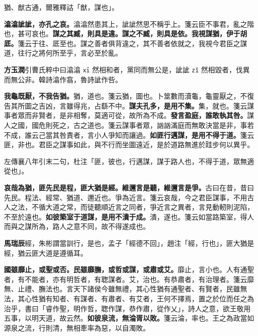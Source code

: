 \begin{quoting}猶、猷古通，爾雅釋詁「猷，謀也」。\end{quoting}

\textbf{潝潝訿訿，亦孔之哀。}{\footnotesize 潝潝然患其上，訿訿然思不稱乎上。箋云臣不事君，亂之階也，甚可哀也。}\textbf{謀之其臧，則具是違。謀之不臧，則具是依。我視謀猶，伊于胡厎。}{\footnotesize 箋云于往、厎至也。謀之善者俱背違之，其不善者依就之，我視今君臣之謀道，往行之將何所至乎，言必至於亂。}

\begin{quoting}\textbf{方玉潤}引曹氏粹中曰潝潝 \texttt{xī} 然相和者，黨同而無公是，訿訿 \texttt{zǐ} 然相毀者，伐異而無公非。韓詩潝作翕，魯詩訿作呰。\end{quoting}

\textbf{我龜既厭，不我告猶。}{\footnotesize 猶，道也。箋云猶，圖也。卜筮數而瀆龜，龜靈厭之，不復告其所圖之吉凶，言雖得兆，占繇不中。}\textbf{謀夫孔多，是用不集。}{\footnotesize 集，就也。箋云謀事者眾而非賢者，是非相奪，莫適可從，故所為不成。}\textbf{發言盈庭，誰敢執其咎。}{\footnotesize 謀人之國，國危則死之，古之道也。箋云謀事者眾，訩訩滿庭而無敢決當是非，事若不成，誰云己當其咎責者，言小人爭知而讓過。}\textbf{如匪行邁謀，是用不得于道。}{\footnotesize 箋云匪，非也。君臣之謀事如此，與不行而坐圖遠近，是於道路無進於跬步何以異乎。}

\begin{quoting}左傳襄八年引末二句，杜注「匪，彼也，行邁謀，謀于路人也，不得于道，眾無適從也」。\end{quoting}

\textbf{哀哉為猶，匪先民是程，匪大猶是經。維邇言是聽，維邇言是爭。}{\footnotesize 古曰在昔，昔曰先民。程法、經常、猶道、邇近也。爭為近言。箋云哀哉，今之君臣謀事，不用古人之法，不循大道之常，而徒聽順近言之同者，爭近言之異者，言見動軔則泥陷，不至於遠也。}\textbf{如彼築室于道謀，是用不潰于成。}{\footnotesize 潰，遂也。箋云如當路築室，得人而與之謀所為，路人之意不同，故不得遂成也。}

\begin{quoting}\textbf{馬瑞辰}經，朱彬謂當訓行，是也，孟子「經德不回」，趙注「經，行也」，匪大猶是經，猶云匪大道是遵循耳。\end{quoting}

\textbf{國雖靡止，或聖或否。民雖靡膴，或哲或謀，或肅或艾。}{\footnotesize 靡止，言小也。人有通聖者，有不能者，亦有明哲者，有聦謀者。艾，治也。有恭肅者，有治理者。箋云靡無、止禮、膴法也。言天下諸侯今雖無禮，其心性猶有通聖者、有賢者，民雖無法，其心性猶有知者、有謀者、有肅者、有艾者，王何不擇焉，置之於位而任之為治乎，書曰「睿作聖，明作哲，聦作謀，恭作肅，從作乂」，詩人之意，欲王敬用五事，以明天道，故云然。}\textbf{如彼泉流，無淪胥以敗。}{\footnotesize 箋云淪，率也。王之為政當如源泉之流，行則清，無相牽率為惡，以自濁敗。}

